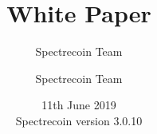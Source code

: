 \documentclass[a4paper,12pt]{book}
\begin{document}
\author{Spectrecoin Team}
\author{Spectrecoin Team}
\title{White Paper}
\date{11th June 2019\\
	Spectrecoin version 3.0.10}

\frontmatter
\maketitle
\tableofcontents

\setlength{\arrayrulewidth}{.5mm}
\setlength{\tabcolsep}{10pt}
\renewcommand{\arraystretch}{1.5}

\mainmatter













\backmatter
\end{document}
